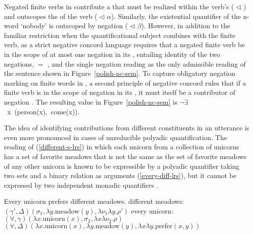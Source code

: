 \documentclass[output=paper,biblatex,babelshorthands,newtxmath,draftmode,colorlinks,citecolor=brown]{langscibook}
\begin{document}
Negated finite verbs in  contribute a  that must be realized
within the verb's  ( $\triangleleft$ ) and
outscopes the  of the verb ( $\triangleleft$ $\alpha$).
Similarly, the existential quantifier of the n-word  `nobody' is
outscoped by negation ( $\triangleleft$ $\beta$). However, in addition
to the familiar restriction when the quantificational subject combines
with the finite verb,  as a strict negative concord language requires
that a negated finite verb be in the scope of at most one negation in
its , entailing identity of the two negations,
 $=$ , and the single negation reading  as
the only admissible reading of the sentence shown in Figure~\ref{polish-nc-sem}.
To capture obligatory negation marking on finite words in , a second
principle of negative concord rules that if a finite verb is in the scope
of negation in its , it must itself be a contributor of negation \citep[316]{RichterandSailer2001}. The resulting  value
in Figure~\ref{polish-nc-sem} is \mbox{{\normalfont \sffamily $\neg \exists$ x (person(x), come(x))}}.

The idea of identifying contributions from different constituents in
an utterance is even more pronounced in cases of unreducible polyadic
quantification. The reading of (\ref{different-s-lrs}) in which each
unicorn from a collection of unicorns has a set of favorite meadows that
is not the same as the set of favorite meadows of any other unicorn is known
to be expressible by a polyadic quantifier taking two sets and a binary
relation as arguments (\ref{every-diff-lrs}), but it cannot be expressed by
two independent monadic quantifiers \citep{Keenan1992b}.


\begin{exe}
\ex\label{different-lrs}
\begin{xlist}
\ex\label{different-s-lrs} Every unicorn prefers different meadows.
\ex \label{different-meadows-lrs}
different meadows: \hspace{0.18cm} $(\gamma', \Delta)(\sigma_1, \lambda y.\text{meadow}(y), \lambda \nu_1\lambda y.\rho')$
\ex \label{every-unicorn-lrs}
every unicorn: \hspace{0.95cm}$(\forall, \gamma)(\lambda x.\text{unicorn}(x), \sigma_2, \lambda x\lambda \nu_2.\rho)$
\ex \label{every-diff-lrs}
$(\forall, \Delta)(\lambda x.\text{unicorn}(x), \lambda y.\text{meadow}(y), \lambda x\lambda y.\text{prefer}(x,y))$
\end{xlist}
\end{exe}
\end{document}
